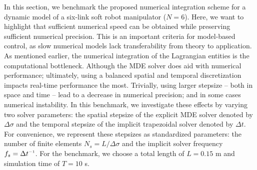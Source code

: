 \begin{example}
\noindent In this section, we benchmark the proposed numerical integration scheme for a dynamic model of a six-link soft robot manipulator ($N = 6$). Here, we want to highlight that sufficient numerical speed can be obtained while preserving sufficient numerical precision. This is an important criteria for model-based control, as slow numerical models lack transferability from theory to application. As mentioned earlier, the numerical integration of the Lagrangian entities is the computational bottleneck. Although the MDE solver does aid with numerical performance; ultimately, using a balanced spatial and temporal discretization impacts real-time performance the most. Trivially, using larger stepsize -- both in space and time -- lead to a decrease in numerical precision; and in some cases numerical instability. In this benchmark, we investigate these effects by varying two solver parameters: the spatial stepsize of the explicit MDE solver denoted by $\Delta \sigma$ and the temporal stepsize of the implicit trapezoidal solver denoted by $\Delta t$. For convenience, we represent these stepsizes as standardized parameters: the number of finite elements $N_s = L/\Delta \sigma$ and the implicit solver frequency $f_s = \Delta t\inv$. For the benchmark, we choose a total length of $L = 0.15$ m and simulation time of $T = 10$ s.
\end{example}


